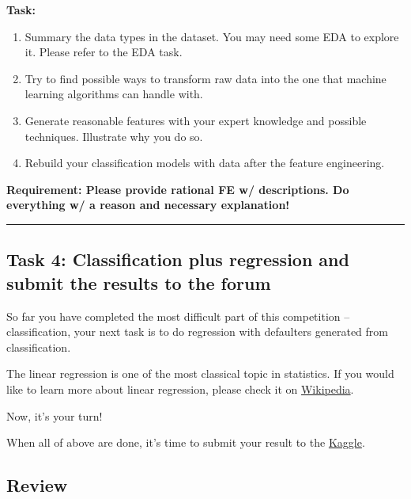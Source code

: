 \documentclass[11pt]{article}
\providecommand{\tightlist}{%
      \setlength{\itemsep}{0pt}\setlength{\parskip}{0pt}}
\begin{document}
\textbf{Task:}

\begin{enumerate}
\def\labelenumi{\arabic{enumi}.}
\tightlist
\item
  Summary the data types in the dataset. You may need some EDA to
  explore it. Please refer to the EDA task.
\item
  Try to find possible ways to transform raw data into the one that
  machine learning algorithms can handle with.
\item
  Generate reasonable features with your expert knowledge and possible
  techniques. Illustrate why you do so.
\item
  Rebuild your classification models with data after the feature
  engineering.
\end{enumerate}

\textbf{Requirement: Please provide rational FE w/ descriptions. Do
everything w/ a reason and necessary explanation!}

    \begin{center}\rule{0.5\linewidth}{\linethickness}\end{center}

\hypertarget{task-4-classification-plus-regression-and-submit-the-results-to-the-forum}{%
\subsection{Task 4: Classification plus regression and submit the
results to the
forum}\label{task-4-classification-plus-regression-and-submit-the-results-to-the-forum}}

So far you have completed the most difficult part of this competition --
classification, your next task is to do regression with defaulters
generated from classification.

The linear regression is one of the most classical topic in statistics.
If you would like to learn more about linear regression, please check it
on \href{https://en.wikipedia.org/wiki/Linear_regression}{Wikipedia}.

Now, it's your turn!

    When all of above are done, it's time to submit your result to the
\href{https://www.kaggle.com/c/loan-default-prediction}{Kaggle}.

    \hypertarget{review}{%
\subsection{Review}\label{review}}
\end{document}

